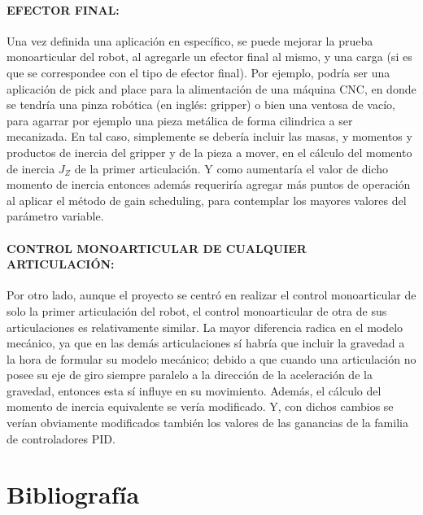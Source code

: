 \documentclass{article}
\begin{document}
\begin{sloppypar}
\paragraph{EFECTOR FINAL:}
\label{sec:EFECTOR FINAL:}
\hfill

Una vez definida una aplicación en específico, se puede mejorar la prueba monoarticular del robot, al agregarle un efector final al mismo, y una carga (si es que se correspondee con el tipo de efector final). Por ejemplo, podría ser una aplicación de pick and place para la alimentación de una máquina CNC, en donde se tendría una pinza robótica (en inglés: gripper) o bien una ventosa de vacío, para agarrar por ejemplo una pieza metálica de forma cilindrica a ser mecanizada. En tal caso, simplemente se debería incluir las masas, y momentos y productos de inercia del gripper y de la pieza a mover, en el cálculo del momento de inercia $J_Z$ de la primer articulación. Y como aumentaría el valor de dicho momento de inercia entonces además requeriría agregar más puntos de operación al aplicar el método de gain scheduling, para contemplar los mayores valores del parámetro variable.


\paragraph{CONTROL MONOARTICULAR DE CUALQUIER ARTICULACIÓN:}
\label{sec:CONTROL MONOARTICULAR DE CUALQUIER ARTICULACIÓN:}
\hfill

Por otro lado, aunque el proyecto se centró en realizar el control monoarticular de solo la primer articulación del robot, el control monoarticular de otra de sus articulaciones es relativamente similar. La mayor diferencia radica en el modelo mecánico, ya que en las demás articulaciones sí habría que incluir la gravedad a la hora de formular su modelo mecánico; debido a que cuando una articulación no posee su eje de giro siempre paralelo a la dirección de la aceleración de la gravedad, entonces esta sí influye en su movimiento. Además, el cálculo del momento de inercia equivalente se vería modificado. Y, con dichos cambios se verían obviamente modificados también los valores de las ganancias de la familia de controladores PID.









\section*{Bibliografía}


\end{sloppypar}
\end{document}
